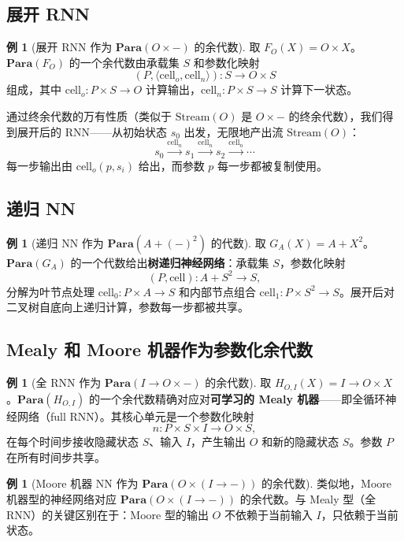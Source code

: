 \documentclass[12pt,a4paper]{ctexart}
\theoremstyle{definition}
\newtheorem{example}[definition]{例}
\newcommand{\cat}[1]{\mathbf{#1}}
\newcommand{\Para}{\cat{Para}}
\newcommand{\Stream}{\mathrm{Stream}}
\newcommand{\cell}{\mathrm{cell}}
\begin{document}
\subsection{展开 RNN}

\begin{example}[展开 RNN 作为 $\Para(O\times-)$ 的余代数]\label{ex:unfolding-rnn}
取 $F_O(X)=O\times X$。$\Para(F_O)$ 的一个余代数由承载集 $S$ 和参数化映射
\[(P,\langle\cell_o,\cell_n\rangle):S\longrightarrow O\times S\]
组成，其中 $\cell_o:P\times S\to O$ 计算输出，$\cell_n:P\times S\to S$ 计算下一状态。

通过终余代数的万有性质（类似于 $\Stream(O)$ 是 $O\times-$ 的终余代数），我们得到展开后的 RNN——从初始状态 $s_0$ 出发，无限地产出流 $\Stream(O)$：
\[s_0\xrightarrow{\cell_n}s_1\xrightarrow{\cell_n}s_2\xrightarrow{\cell_n}\cdots\]
每一步输出由 $\cell_o(p,s_i)$ 给出，而参数 $p$ 每一步都被复制使用。
\end{example}

\subsection{递归 NN}

\begin{example}[递归 NN 作为 $\Para(A+(-)^2)$ 的代数]\label{ex:recursive-nn}
取 $G_A(X)=A+X^2$。$\Para(G_A)$ 的一个代数给出\textbf{树递归神经网络}：承载集 $S$，参数化映射
\[(P,\cell):A+S^2\longrightarrow S,\]
分解为叶节点处理 $\cell_0:P\times A\to S$ 和内部节点组合 $\cell_1:P\times S^2\to S$。展开后对二叉树自底向上递归计算，参数每一步都被共享。
\end{example}

\subsection{Mealy 和 Moore 机器作为参数化余代数}

\begin{example}[全 RNN 作为 $\Para(I\to O\times-)$ 的余代数]
取 $H_{O,I}(X)=I\to O\times X$。$\Para(H_{O,I})$ 的一个余代数精确对应对\textbf{可学习的 Mealy 机器}——即全循环神经网络（full RNN）。其核心单元是一个参数化映射
\[n:P\times S\times I\longrightarrow O\times S,\]
在每个时间步接收隐藏状态 $S$、输入 $I$，产生输出 $O$ 和新的隐藏状态 $S$。参数 $P$ 在所有时间步共享。
\end{example}

\begin{example}[Moore 机器 NN 作为 $\Para(O\times(I\to-))$ 的余代数]
类似地，Moore 机器型的神经网络对应 $\Para(O\times(I\to-))$ 的余代数。与 Mealy 型（全 RNN）的关键区别在于：Moore 型的输出 $O$ 不依赖于当前输入 $I$，只依赖于当前状态。
\end{example}
\end{document}
